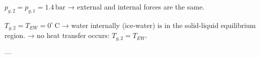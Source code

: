 \( p_{g,2} = p_{g,1} = 1.4 \, \text{bar} \) → external and internal forces are the same.  

\( T_{g,2} = T_{EW} = 0^\circ \, \text{C} \) → water internally (ice-water) is in the solid-liquid equilibrium region.  
→ no heat transfer occurs: \( T_{g,2} = T_{EW} \).  

---
